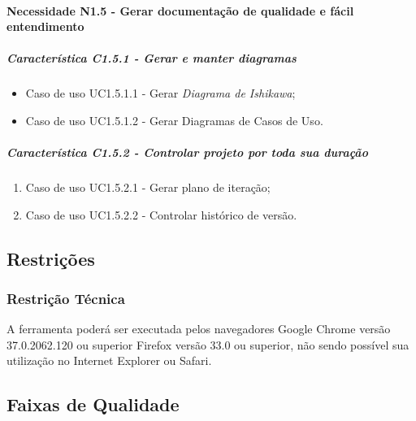 \paragraph{Necessidade N1.5 - Gerar documentação de qualidade e fácil entendimento}
	\subparagraph{Característica C1.5.1 - Gerar e manter diagramas}
		\begin{itemize}
			\item Caso de uso UC1.5.1.1 - Gerar \textit{Diagrama de Ishikawa};
			\item Caso de uso UC1.5.1.2 - Gerar Diagramas de Casos de Uso.
		\end{itemize}

	\subparagraph{Característica C1.5.2 - Controlar projeto por toda sua duração}
		\begin{enumerate}
			\item Caso de uso UC1.5.2.1 - Gerar plano de iteração;
			\item Caso de uso UC1.5.2.2 - Controlar histórico de versão.
		\end{enumerate}

\subsection{Restrições}
\subsubsection{Restrição Técnica}

A ferramenta poderá ser executada pelos navegadores Google Chrome versão 37.0.2062.120 ou superior Firefox versão 33.0 ou superior, não sendo possível sua utilização no Internet Explorer ou Safari.


\subsection{Faixas de Qualidade}



